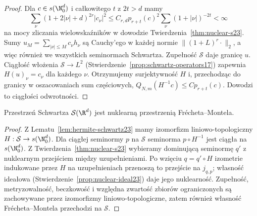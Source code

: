 \begin{proof}
Dla $c\in s(\N_0^d)$ i całkowitego $t$ z $2t>d$ mamy
\[
 \sum_\nu(1+2|\nu|+d)^{2r}|c_\nu|^2
 \le C_{r,d}p_{r+t}(c)^2
 \sum_\nu(1+|\nu|)^{-2t}<\infty
\]
na mocy zliczania wielowskaźników w dowodzie
Twierdzenia~\ref{thm:nuclear-s23}.
Sumy $u_M=\sum_{|\nu|\le M}c_\nu h_\nu$ są Cauchy'ego
w każdej normie $\|(1+L)^r\cdot\|_2$, a więc również
we wszystkich seminormach Schwartza. Zupełność
$\mathcal S$ daje granicę $u$. Ciągłość włożenia
$\mathcal S\to L^2$ (Stwierdzenie~\ref{prop:schwartz-operators17})
zapewnia $H(u)_\nu=c_\nu$ dla każdego $\nu$.
Otrzymujemy surjektywność $H$ i, przechodząc do granicy
w oszacowaniach sum częściowych,
$Q_{N,m}(H^{-1}c)\le C p_{r+t}(c)$.
Dowodzi to ciągłości odwrotności.
\end{proof}

\begin{wniosek}
\label{cor:nuclear-schwartz23}
Przestrzeń Schwartza $\mathcal S(\R^d)$ jest nuklearną
przestrzenią Frécheta--Montela.
\end{wniosek}
\begin{proof}
Z Lematu~\ref{lem:hermite-schwartz23} mamy izomorfizm
liniowo-topologiczny $H:\mathcal S\to s(\N_0^d)$.
Dla ciągłej seminormy $p$ na $\mathcal S$ seminorma
$p\circ H^{-1}$ jest ciągła na $s(\N_0^d)$.
Z Twierdzenia~\ref{thm:nuclear-s23} wybieramy dominującą
seminormę $q'$ z nuklearnym przejściem między
uzupełnieniami. Po wzięciu $q=q'\circ H$ izometrie
indukowane przez $H$ na uzupełnieniach przenoszą
to przejście na $j_{q,p}$; własność ideałowa
(Stwierdzenie~\ref{prop:nuclear-ideal23}) daje jego
nuklearność. Zupełność, metryzowalność, beczkowość
i względna zwartość zbiorów ograniczonych są zachowywane
przez izomorfizmy liniowo-topologiczne, zatem również
własność Frécheta--Montela przechodzi na $\mathcal S$.
\end{proof}

